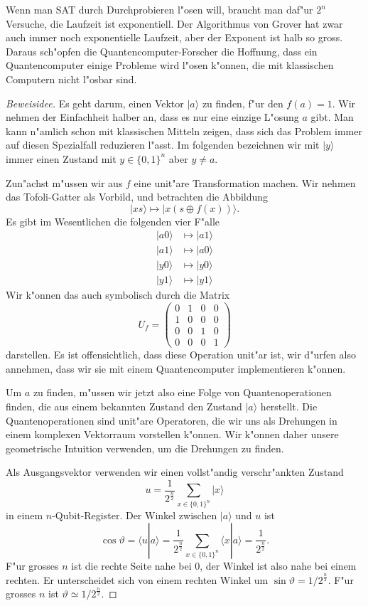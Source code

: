 Wenn man SAT durch Durchprobieren l"osen will, braucht man daf"ur $2^n$
Versuche, die Laufzeit ist exponentiell.
Der Algorithmus von Grover hat zwar auch immer noch exponentielle Laufzeit,
aber der Exponent ist halb so gross.
Daraus sch"opfen die Quantencomputer-Forscher die Hoffnung, dass 
ein Quantencomputer einige Probleme wird l"osen k"onnen, die mit
klassischen Computern nicht l"osbar sind.

\begin{proof}[Beweisidee]
Es geht darum, einen Vektor $|a\rangle$ zu finden, f"ur den $f(a)=1$.
Wir nehmen der Einfachheit halber an, dass es nur eine einzige L"osung $a$
gibt.
Man kann n"amlich schon mit klassischen Mitteln zeigen, dass sich das
Problem immer auf diesen Spezialfall reduzieren l"asst.
Im folgenden bezeichnen wir mit $|y\rangle$ immer einen Zustand mit
$y\in\{0,1\}^n$ aber $y\ne a$.

Zun"achst m"ussen wir aus $f$ eine unit"are Transformation machen.
Wir nehmen das Tofoli-Gatter als Vorbild, und betrachten die Abbildung
\[
|x s\rangle \mapsto |x (s\oplus f(x))\rangle.
\]
Es gibt im Wesentlichen die folgenden vier F"alle
\begin{align*}
|a0\rangle&\mapsto |a1\rangle\\
|a1\rangle&\mapsto |a0\rangle\\
|y0\rangle&\mapsto |y0\rangle\\
|y1\rangle&\mapsto |y1\rangle
\end{align*}
Wir k"onnen das auch symbolisch durch die Matrix
\[
U_f
=
\begin{pmatrix}
0&1&0&0\\
1&0&0&0\\
0&0&1&0\\
0&0&0&1
\end{pmatrix}
\]
darstellen. Es ist offensichtlich, dass diese Operation unit"ar ist, 
wir d"urfen also annehmen, dass wir sie mit einem Quantencomputer
implementieren k"onnen.

Um $a$ zu finden, m"ussen wir jetzt also eine Folge von Quantenoperationen
finden, die aus einem bekannten Zustand den Zustand $|a\rangle$ herstellt.
Die Quantenoperationen sind unit"are Operatoren, die wir uns als Drehungen
in einem komplexen Vektorraum vorstellen k"onnen.
Wir k"onnen daher unsere geometrische Intuition verwenden, um die Drehungen
zu finden.

Als Ausgangsvektor verwenden wir einen vollst"andig verschr"ankten Zustand
\[
u=\frac1{2^{\frac{n}2}}\sum_{x\in\{0,1\}^n}|x\rangle
\]
in einem $n$-Qubit-Register.
Der Winkel zwischen $|a\rangle$ und $u$ ist
\[
\cos\vartheta
=
\langle u|a\rangle
=
\frac1{2^{\frac{n}2}}
\sum_{x\in\{0,1\}^n}\langle x|a\rangle
=
\frac1{2^{\frac{n}2}}.
\]
F"ur grosses $n$ ist die rechte Seite nahe bei $0$, der Winkel ist
also nahe bei einem rechten.
Er unterscheidet sich von einem rechten Winkel um
$\sin\vartheta=1/2^{\frac{n}2}$.
F"ur grosses $n$ ist $\vartheta\simeq 1/2^{\frac{n}2}$.


\end{proof}
